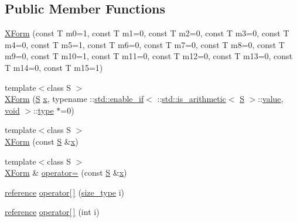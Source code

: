 \subsection*{Public Member Functions}
\begin{DoxyCompactItemize}
\item 
\hyperlink{classtrimesh_1_1XForm_a584b619d8b4bb2d732099158db11a15d}{X\+Form} (const T m0=1, const T m1=0, const T m2=0, const T m3=0, const T m4=0, const T m5=1, const T m6=0, const T m7=0, const T m8=0, const T m9=0, const T m10=1, const T m11=0, const T m12=0, const T m13=0, const T m14=0, const T m15=1)
\item 
{\footnotesize template$<$class S $>$ }\\\hyperlink{classtrimesh_1_1XForm_ad17f97479a3859930325bc2909689b90}{X\+Form} (\hyperlink{ego_8cc_abde73cd36321648268fb4543509b996a}{S} \hyperlink{namespacetrimesh_a3365d1b1a1bc5d8e9c844cf589a8c4a8}{x}, typename \+::\hyperlink{structstd_1_1enable__if}{std\+::enable\+\_\+if}$<$ \+::\hyperlink{structstd_1_1is__arithmetic}{std\+::is\+\_\+arithmetic}$<$ \hyperlink{ego_8cc_abde73cd36321648268fb4543509b996a}{S} $>$\+::\hyperlink{namespacetrimesh_ab10cc1052c9d1d1376d92211b6ca27dd}{value}, \hyperlink{namespacetrimesh_a784ddfd979e1c579bda795a8edfc3f43}{void} $>$\+::\hyperlink{namespacetrimesh_aa726c5bf9cff74a26269e8d258ae9e3d}{type} $\ast$=0)
\item 
{\footnotesize template$<$class S $>$ }\\\hyperlink{classtrimesh_1_1XForm_ac922680551ebcaa9b6861a1542e7db77}{X\+Form} (const \hyperlink{ego_8cc_abde73cd36321648268fb4543509b996a}{S} \&\hyperlink{namespacetrimesh_a3365d1b1a1bc5d8e9c844cf589a8c4a8}{x})
\item 
{\footnotesize template$<$class S $>$ }\\\hyperlink{classtrimesh_1_1XForm}{X\+Form} \& \hyperlink{classtrimesh_1_1XForm_a7bc55b666906296d2079ef12e0786a4f}{operator=} (const \hyperlink{ego_8cc_abde73cd36321648268fb4543509b996a}{S} \&\hyperlink{namespacetrimesh_a3365d1b1a1bc5d8e9c844cf589a8c4a8}{x})
\item 
\hyperlink{classtrimesh_1_1XForm_afef5285ff7d9ea2e25a4bb4d966bd674}{reference} \hyperlink{classtrimesh_1_1XForm_a65fd04c7ce3d18070b5a46c60fc9d2e5}{operator\mbox{[}$\,$\mbox{]}} (\hyperlink{classtrimesh_1_1XForm_aa219f141417c9026a74dec8b6279d4bf}{size\+\_\+type} i)
\item 
\hyperlink{classtrimesh_1_1XForm_afef5285ff7d9ea2e25a4bb4d966bd674}{reference} \hyperlink{classtrimesh_1_1XForm_a1957b360b9cfde140d24240229d04df8}{operator\mbox{[}$\,$\mbox{]}} (int i)

\end{DoxyCompactItemize}
